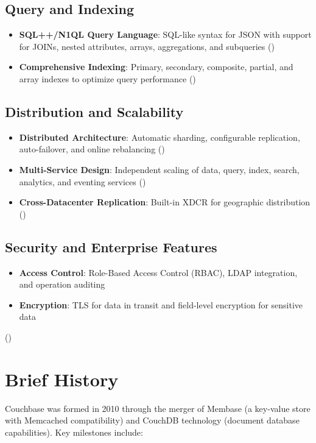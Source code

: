 \subsection{Query and Indexing}
\begin{itemize}
  \item \textbf{SQL++/N1QL Query Language}: SQL-like syntax for JSON with support for JOINs, nested attributes, arrays, aggregations, and subqueries (\cite[SQL++ versus SQL]{couchabse_data})
  \item \textbf{Comprehensive Indexing}: Primary, secondary, composite, partial, and array indexes to optimize query performance (\cite[Indexes]{couchabse_data})
\end{itemize}

\subsection{Distribution and Scalability}
\begin{itemize}
  \item \textbf{Distributed Architecture}: Automatic sharding, configurable replication, auto-failover, and online rebalancing (\cite{couchbase_services})
  \item \textbf{Multi-Service Design}: Independent scaling of data, query, index, search, analytics, and eventing services (\cite{couchbase_services})
  \item \textbf{Cross-Datacenter Replication}: Built-in XDCR for geographic distribution (\cite{couchabse_xdcr})
\end{itemize}

\subsection{Security and Enterprise Features}
\begin{itemize}
  \item \textbf{Access Control}: Role-Based Access Control (RBAC), LDAP integration, and operation auditing
  \item \textbf{Encryption}: TLS for data in transit and field-level encryption for sensitive data
\end{itemize}
(\cite{couchbase_security})


\section{Brief History}

Couchbase was formed in 2010 through the merger of Membase (a key-value store with Memcached compatibility) and CouchDB technology (document database capabilities). Key milestones include:

